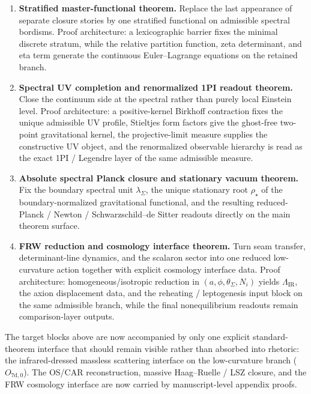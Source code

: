 \begin{tcolorbox}[colback=tfptblue!2, colframe=tfptblue!40, breakable,
    title={Version 4.5 completion surface}, colbacktitle=tfptblue!60]
\begin{enumerate}[leftmargin=1.5em, topsep=3pt, itemsep=4pt]
    \item \textbf{ Stratified master-functional theorem.} Replace the last appearance of separate closure stories by one stratified functional on admissible spectral bordisms. Proof architecture: a lexicographic barrier fixes the minimal discrete stratum, while the relative partition function, zeta determinant, and eta term generate the continuous Euler--Lagrange equations on the retained branch.
    \item \textbf{ Spectral UV completion and renormalized 1PI readout theorem.} Close the continuum side at the spectral rather than purely local Einstein level. Proof architecture: a positive-kernel Birkhoff contraction fixes the unique admissible UV profile, Stieltjes form factors give the ghost-free two-point gravitational kernel, the projective-limit measure supplies the constructive UV object, and the renormalized observable hierarchy is read as the exact 1PI / Legendre layer of the same admissible measure.
    \item \textbf{ Absolute spectral Planck closure and stationary vacuum theorem.} Fix the boundary spectral unit $\lambda_\Sigma$, the unique stationary root $\rho_\star$ of the boundary-normalized gravitational functional, and the resulting reduced-Planck / Newton / Schwarzschild--de Sitter readouts directly on the main theorem surface.
    \item \textbf{ FRW reduction and cosmology interface theorem.} Turn seam transfer, determinant-line dynamics, and the scalaron sector into one reduced low-curvature action together with explicit cosmology interface data. Proof architecture: homogeneous/isotropic reduction in $(a,\phi,\theta_\Sigma,N_i)$ yields $\Lambda_{\mathrm{IR}}$, the axion displacement data, and the reheating / leptogenesis input block on the same admissible branch, while the final nonequilibrium readouts remain comparison-layer outputs.
\end{enumerate}
\end{tcolorbox}

\begin{remark}
The target blocks above are now accompanied by only one explicit standard-theorem interface that
should remain visible rather than absorbed into rhetoric: the infrared-dressed massless scattering
interface on the low-curvature branch ($O_{7\mathrm{d,0}}$). The OS/CAR reconstruction, massive
Haag--Ruelle / LSZ closure, and the FRW cosmology interface are now carried by manuscript-level
appendix proofs.
\end{remark}

